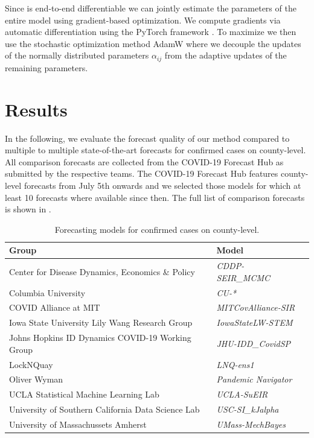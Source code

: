 \documentclass[nobib]{tufte-handout}
\begin{document}
Since  is end-to-end differentiable we can jointly estimate the
parameters of the entire model using gradient-based optimization. We compute
gradients via automatic differentiation using the PyTorch framework
\citep{paszke2019pytorch}. To maximize  we then use the stochastic
optimization method AdamW \citep{loshchilov2018decoupled} where we decouple the
updates of the normally distributed parameters \(\alpha_{ij}\) from the adaptive
updates of the remaining parameters.

\section{Results}
\label{sec:org7d76cd4}
In the following, we evaluate the forecast quality of our method compared to
multiple to multiple state-of-the-art forecasts for confirmed cases on
county-level. All comparison forecasts are collected from the COVID-19 Forecast
Hub as submitted by
the respective teams. The COVID-19 Forecast Hub features county-level forecasts
from July 5th onwards and we selected those models for which at least 10 forecasts
where available since then. The full list of comparison forecasts is shown in
.

\begin{table}[t]
\small
\centering
\begin{tabular}{lll}
\toprule
\bf Group & \bf Model \\
\midrule
Center for Disease Dynamics, Economics \& Policy & \it CDDP-SEIR\_MCMC & \citep{cddep_seir_mcmc} \\
Columbia University & \it CU-* & \citep{forecasts/columbia} \\
COVID Alliance at MIT & \it MITCovAlliance-SIR & \citep{baek2020limits} \\
Iowa State University Lily Wang Research Group & \it IowaStateLW-STEM & \citep{wang2020spatiotemporal} \\
Johns Hopkins ID Dynamics COVID-19 Working Group & \it JHU-IDD\_CovidSP & \citep{forecasts/jhu_idd_covidsp} \\
LockNQuay & \it LNQ-ens1 & \citep{forecasts/lnq_ens1} \\
Oliver Wyman & \it Pandemic Navigator & \citep{forecasts/oliver_wyman} \\
UCLA Statistical Machine Learning Lab & \it UCLA-SuEIR & \citep{forecasts/Zou2020.05.24.20111989} \\
University of Southern California Data Science Lab & \it USC-SI\_kJalpha & \citep{srivastava2020fast} \\
University of Massachussets Amherst & \it UMass-MechBayes & \citep{forecasts/umass_mechbayes} \\
\bottomrule
\end{tabular}
\vspace*{2em}
\caption{Forecasting models for confirmed cases on county-level.\label{tab:forecasts}}
\end{table}
\end{document}
